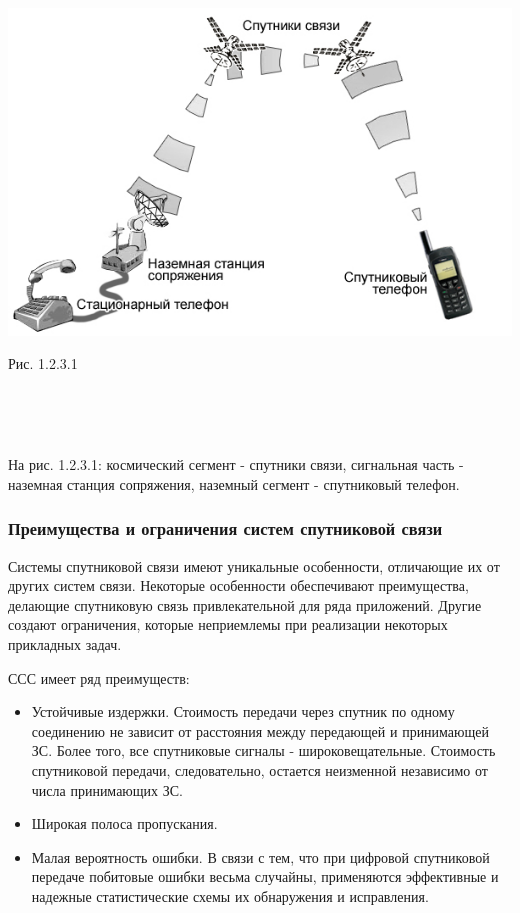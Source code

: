 \documentclass[a4paper]{report}
\begin{document}
\includegraphics[scale=0.7]{70}
{\centering\caption{\newline Рис. 1.2.3.1}\\}

~

На рис. 1.2.3.1: космический сегмент - спутники связи, сигнальная часть - наземная станция сопряжения, наземный сегмент - спутниковый телефон.

\subsubsection{Преимущества и ограничения систем спутниковой связи}
Системы спутниковой связи имеют уникальные особенности, отличающие их от других систем связи. Некоторые особенности обеспечивают преимущества, делающие спутниковую связь привлекательной для ряда приложений. Другие создают ограничения, которые неприемлемы при реализации некоторых прикладных задач.

ССС имеет ряд преимуществ:
\begin{itemize}
\item Устойчивые издержки. Стоимость передачи через спутник по одному соединению не зависит от расстояния между передающей и принимающей ЗС. Более того, все спутниковые сигналы - широковещательные. Стоимость спутниковой передачи, следовательно, остается неизменной независимо от числа принимающих ЗС.
\item Широкая полоса пропускания.
\item Малая вероятность ошибки. В связи с тем, что при цифровой спутниковой передаче побитовые ошибки весьма случайны, применяются эффективные и надежные статистические схемы их обнаружения и исправления.
\end{itemize}
\end{document}
